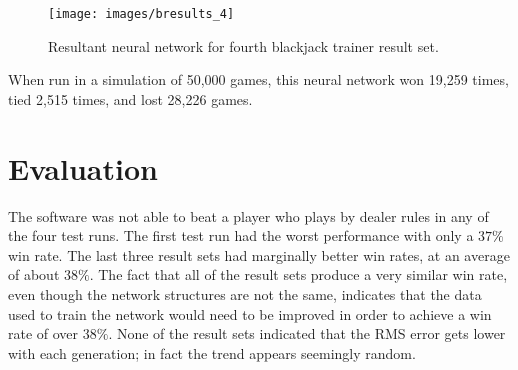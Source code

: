 \begin{figure}[h!]
  \centering
  \texttt{[image: images/bresults\_4]}
  \caption{Resultant neural network for fourth blackjack trainer result set.}
  \label{bresults_4}
\end{figure}

When run in a simulation of 50,000 games, this neural network won 19,259
times, tied 2,515 times, and lost 28,226 games.

\section{Evaluation}
The software was not able to beat a player who plays by dealer rules
in any of the four test runs.
The first test run had the worst performance with only a $37\%$ win
rate. 
The last three result sets had marginally better win rates, at an
average of about $38\%$.
The fact that all of the result sets produce a very similar win rate,
even though the network structures are not the same, indicates that
the data used to train the network would need to be improved in order
to achieve a win rate of over $38\%$.
None of the result sets indicated that the RMS error gets lower with
each generation; in fact the trend appears seemingly random.

